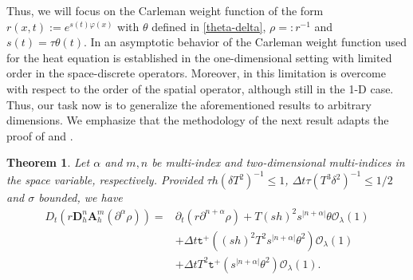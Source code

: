 \documentclass[11pt,oneside,leqno]{amsart}
\numberwithin{equation}{section}
\numberwithin{equation}{section}
\newtheorem{theorem}{Theorem}[section]
\newcommand{\trp}{\mathtt t^+}
\begin{document}
Thus, we will focus on the Carleman weight function of the form $r(x,t):=e^{s(t)\varphi(x)}$ with $\theta$ defined in \eqref{theta-delta}, $\rho=:r^{-1}$ and $s(t)=\tau\theta(t)$.
In \cite{GC-HS-2021} an asymptotic behavior of the Carleman weight function used for the heat equation is established in the one-dimensional setting with limited order in the space-discrete operators.
Moreover, in \cite[Theorem 5]{LMPZ:2023} this limitation is overcome with respect to the order of the spatial operator, although still in the 1-D case. Thus, our task now is to generalize the aforementioned results to arbitrary dimensions. We emphasize that the methodology of the next result adapts the proof of \cite[Lemma A.16]{GC-HS-2021} and \cite[Theorem 5]{LOP-2020}.
\begin{theorem}\label{theo:fully:weight:estimates}
Let $\alpha$ and $m,n$ be multi-index and two-dimensional multi-indices in the space variable, respectively. Provided $\tau h(\delta T^{2})^{-1}\leq 1$, $\Delta t \tau(T^{3}\delta^{2})^{-1}\leq 1/2$ and $\sigma$ bounded, we have
\begin{equation}\label{eq:prop:time:estimate}
    \begin{aligned}
    D_{t}(r\mathbf{D}_{h}^{n}\mathbf{A}_{h}^{m}(\partial^{\alpha}\rho))=&\partial_{t}(r\partial^{n+\alpha}\rho)+T(sh)^{2}s^{|n+\alpha|}\theta\mathcal{O}_{\lambda}(1)\\
    &+\Delta t \trp((sh)^{2}T^{2}s^{|n+\alpha|}\theta^{2})\mathcal{O}_{\lambda}(1)\\
    &+\Delta t T^{2}\trp(s^{|n+\alpha|}\theta^{2})\mathcal{O}_{\lambda}(1).
\end{aligned}
\end{equation}
\end{theorem}
\end{document}
